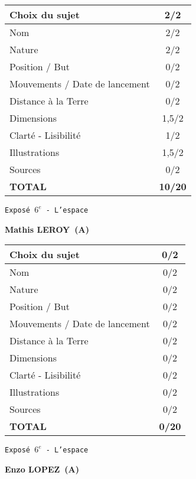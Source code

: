 	\vspace*{2cm}
	\begin{tabular}{|l|c|}
		\hline
		Choix du sujet & 2/2 \\
		\hline
		Nom & 2/2 \\
		\hline
		Nature & 2/2 \\
		\hline
		Position / But & 0/2 \\
		\hline
		Mouvements / Date de lancement & 0/2 \\
		\hline
		Distance \`a la Terre & 0/2 \\
		\hline
		Dimensions & 1,5/2 \\
		\hline
		Clart\'e - Lisibilit\'e & 1/2 \\
		\hline
		Illustrations & 1,5/2 \\
		\hline
		Sources & 0/2 \\
		\hline
		\textbf{TOTAL}  & \textbf{10/20} \\
		\hline
	\end{tabular}
	\newline
	\LARGE{\texttt{Expos\'e $6^e$ - L'espace}}
	\vspace*{1cm}

	\textbf{Mathis LEROY\ (A)}

	\vspace*{2cm}
	\begin{tabular}{|l|c|}
		\hline
		Choix du sujet & 0/2 \\
		\hline
		Nom & 0/2 \\
		\hline
		Nature & 0/2 \\
		\hline
		Position / But & 0/2 \\
		\hline
		Mouvements / Date de lancement & 0/2 \\
		\hline
		Distance \`a la Terre & 0/2 \\
		\hline
		Dimensions & 0/2 \\
		\hline
		Clart\'e - Lisibilit\'e & 0/2 \\
		\hline
		Illustrations & 0/2 \\
		\hline
		Sources & 0/2 \\
		\hline
		\textbf{TOTAL}  & \textbf{0/20} \\
		\hline
	\end{tabular}
	\newline
	\LARGE{\texttt{Expos\'e $6^e$ - L'espace}}
	\vspace*{1cm}

	\textbf{Enzo LOPEZ\ (A)}

